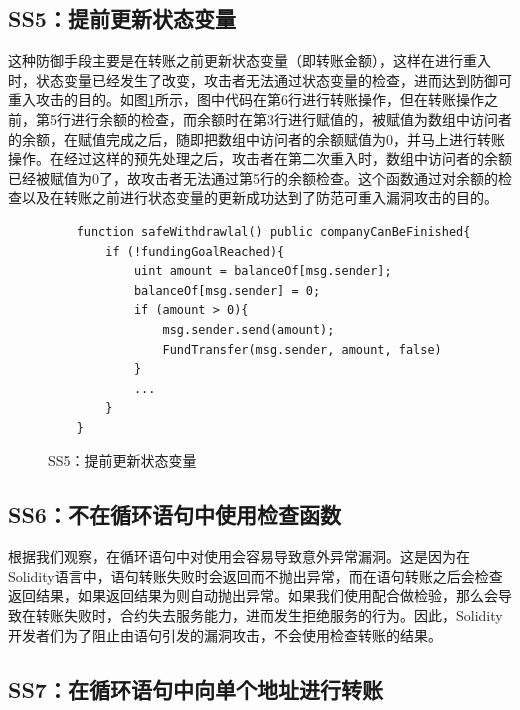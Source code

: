 \subsection{SS5：提前更新状态变量}
这种防御手段主要是在转账之前更新状态变量（即转账金额），这样在进行重入时，状态变量已经发生了改变，攻击者无法通过状态变量的检查，进而达到防御可重入攻击的目的。如图\ref{fig:ss5_example}所示，图中代码在第6行进行转账操作，但在转账操作之前，第5行进行余额的检查，而余额时在第3行进行赋值的，被赋值为数组中访问者的余额，在赋值完成之后，随即把数组中访问者的余额赋值为0，并马上进行转账操作。在经过这样的预先处理之后，攻击者在第二次重入时，数组中访问者的余额已经被赋值为0了，故攻击者无法通过第5行的余额检查。这个函数通过对余额的检查以及在转账之前进行状态变量的更新成功达到了防范可重入漏洞攻击的目的。
\begin{figure}
\begin{minipage}[htbp]{1.0\linewidth}
    \begin{lstlisting}
    function safeWithdrawlal() public companyCanBeFinished{
        if (!fundingGoalReached){
            uint amount = balanceOf[msg.sender];
            balanceOf[msg.sender] = 0;
            if (amount > 0){
                msg.sender.send(amount);
                FundTransfer(msg.sender, amount, false)
            }
            ...
        }
    }
    \end{lstlisting}
\end{minipage}
\vspace{-5mm}
\caption{SS5：提前更新状态变量}
\label{fig:ss5_example}
\end{figure}

\subsection{SS6：不在循环语句中使用检查函数}\label{sec:ss6}

根据我们观察，在循环语句中对使用会容易导致意外异常漏洞。这是因为在Solidity语言中，语句转账失败时会返回而不抛出异常，而在语句转账之后会检查返回结果，如果返回结果为则自动抛出异常。如果我们使用配合做检验，那么会导致在转账失败时，合约失去服务能力，进而发生拒绝服务的行为。因此，Solidity开发者们为了阻止由语句引发的漏洞攻击，不会使用检查转账的结果。

\subsection{SS7：在循环语句中向单个地址进行转账}\label{sec:ss7}

